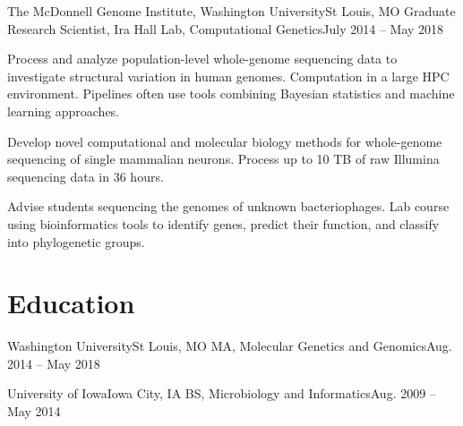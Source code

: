 \resumeItemListEnd


\resumeSubheading
{The McDonnell Genome Institute, Washington University}{St Louis, MO}
{Graduate Research Scientist, Ira Hall Lab, Computational Genetics}{July 2014 -- May 2018}

\resumeItemListStart

{Process and analyze population-level whole-genome sequencing data to investigate structural variation in human genomes. Computation in a large HPC environment. Pipelines often use tools combining Bayesian statistics and machine learning approaches.}

{Develop novel computational and molecular biology methods for whole-genome sequencing of single mammalian neurons. Process up to 10 TB of raw Illumina sequencing data in 36 hours.}

{Advise students sequencing the genomes of unknown bacteriophages. Lab course using bioinformatics tools to identify genes, predict their function, and classify into phylogenetic groups.}

\resumeItemListEnd






\resumeSubHeadingListEnd

\section{Education}
\resumeSubHeadingListStart

\resumeSubheading
{Washington University}{St Louis, MO}
{MA, Molecular Genetics and Genomics}{Aug. 2014 -- May 2018}

\resumeSubheading
{University of Iowa}{Iowa City, IA}
{BS, Microbiology and Informatics}{Aug. 2009 -- May 2014}

